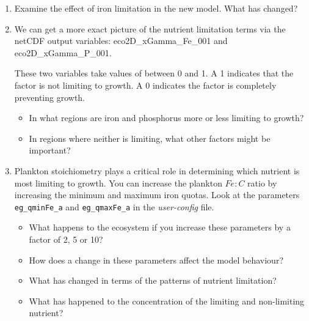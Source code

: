 \documentclass[11pt,fleqn]{book} %
\begin{document}
\begin{enumerate}[noitemsep]
\vspace{1mm}
\item Examine the effect of iron limitation in the new model. What has changed?

\vspace{1mm}
\item We can get a more exact picture of the nutrient limitation terms via the netCDF output variables: \textsf{\footnotesize eco2D\_xGamma\_Fe\_001} and \textsf{\footnotesize eco2D\_xGamma\_P\_001}.

These two variables take values of between 0 and 1. A \textsf{\footnotesize 1} indicates that the factor is not limiting to growth. A \textsf{\footnotesize 0} indicates the factor is completely preventing growth.
\vspace{1mm}
\begin{itemize}
\item In what regions are iron and phosphorus more or less limiting to growth? \item In regions where neither is limiting, what other factors might be important?
\end{itemize}
\vspace{1mm}

\vspace{1mm}
\item  Plankton stoichiometry plays a critical role in determining which nutrient is most limiting to growth. You can increase the plankton \(Fe:C\) ratio by increasing the minimum and maximum iron quotas. Look at the parameters \texttt{eg\_qminFe\_a} and \texttt{eg\_qmaxFe\_a} in the \textit{user-config} file.

\pagebreak
\begin{itemize}
\item What happens to the ecosystem if you increase these parameters by a factor of 2, 5 or 10?
\item How does a change in these parameters affect the model behaviour?
\item What has changed in terms of the patterns of nutrient limitation?
\item What has happened to the concentration of the limiting and non-limiting nutrient?
\end{itemize}


\end{enumerate}
\end{document}
